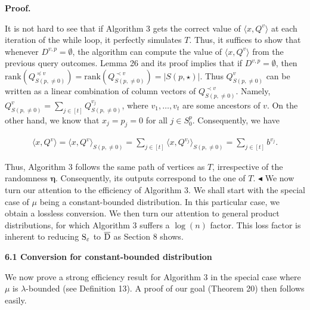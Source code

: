 \documentclass[10pt,a4paper]{article}
\begin{document}




\par\medskip\noindent\textbf{Proof.}\par




It is not hard to see that if Algorithm 3 gets the correct value of $\langle x,Q^{v}\rangle$ at each iteration of the while loop, it perfectly simulates $T$. Thus, it suffices to show that whenever $D^{v,p}=\emptyset$, the algorithm can compute the value of $\langle x,Q^{v}\rangle$ from the previous query outcomes. Lemma 26 and its proof implies that if $D^{v,p}=\emptyset$, then $\mathrm{rank}(Q^{\preceq v}_{S(p,\neq 0)})=\mathrm{rank}(Q^{\prec v}_{S(p,\neq
0)})=|S(p,\star)|$. Thus $Q^{v}_{S(p,\neq 0)}$ can be written as a linear combination of column vectors of $Q^{\prec v}_{S(p,\neq 0)}$. Namely, $Q^{v}_{S(p,\neq 0)}=\sum_{j\in[t]}Q^{v_{j}}_{S(p,\neq 0)}$, where $v_{1},\ldots,v_{t}$ are some ancestors of $v$. On the other hand, we know that $x_{j}=p_{j}=0$ for all $j\in S^{p}_{0}$. Consequently, we have\par


\[\begin{gathered}
\langle x,Q^{v}\rangle=\langle x,Q^{v}\rangle_{S(p,\neq 0)}=\sum\nolimits_{j\in[t]}\langle x,Q^{v_{j}}\rangle_{S(p,\neq 0)}=\sum\nolimits_{j\in[t]}b^{v_{j}}.
\end{gathered}\]


Thus, Algorithm 3 follows the same path of vertices as $T$, irrespective of the randomness $\bm{\eta}$. Consequently, its outputs correspond to the one of $T$.
$\blacktriangleleft$
We now turn our attention to the efficiency of Algorithm 3. We shall start with the special case of $\mu$ being a constant-bounded distribution. In this particular case, we obtain a lossless conversion.
We then turn our attention to general product distributions, for which Algorithm 3 suffers a $\log(n)$ factor. This loss factor is inherent to reducing ${\textup{S}}_{\varepsilon}$ to $\overline{{\textup{D}}}$ as Section 8 shows.\par





\par\medskip\noindent\textbf{
6.1 Conversion for constant-bounded distribution}\par




We now prove a strong efficiency result for Algorithm 3 in the special case where $\mu$ is $\lambda$-bounded (see Definition 13). A proof of our goal (Theorem 20) then follows easily.\par
\end{document}
